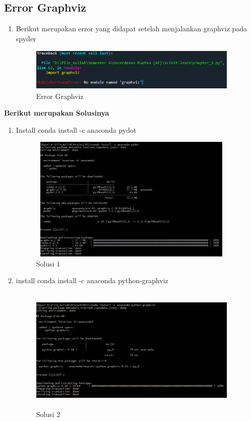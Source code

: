 	\subsection{Error Graphviz}
\begin{enumerate}
	\item Berikut merupakan error yang didapat setelah menjalankan graphviz pada spyder
	\begin{figure}[!htbp]
		\centering
		\includegraphics[width=10cm,height=2cm]{figures/error1.png}
		\caption{Error Graphviz}
		\label{penanda}
	\end{figure}
\end{enumerate}
	\textbf {Berikut merupakan Solusinya}
	\begin{enumerate}
		\item Install conda install -c anaconda pydot
		\begin{figure}[!htbp]
			\centering
			\includegraphics[width=10cm,height=6cm]{figures/solusi1_fix.png}
			\caption{Solusi 1}
			\label{penanda}
		\end{figure}
		\item install conda install -c anaconda python-graphviz
		\begin{figure}[!htbp]
			\centering
			\includegraphics[width=10cm,height=6cm]{figures/solusi1-2_fix.png}
			\caption{Solusi 2}
			\label{penanda}
		\end{figure}
	\end{enumerate}